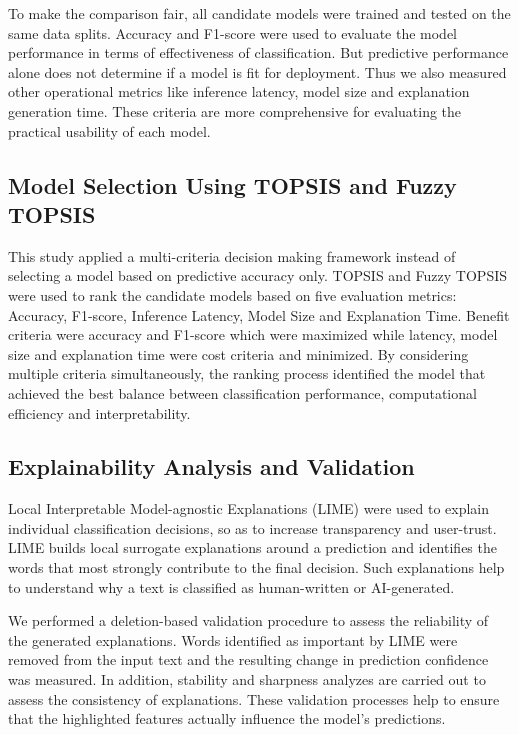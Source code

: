 \documentclass[conference]{IEEEtran}
\begin{document}
To make the comparison fair, all candidate models were trained and tested on the same data splits. Accuracy and F1-score were used to evaluate the model performance in terms of effectiveness of classification. But predictive performance alone does not determine if a model is fit for deployment. Thus we also measured other operational metrics like inference latency, model size and explanation generation time. These criteria are more comprehensive for evaluating the practical usability of each model.


\subsection{\textbf{Model Selection Using TOPSIS and Fuzzy TOPSIS}}


This study applied a multi-criteria decision making framework instead of selecting a model based on predictive accuracy only. TOPSIS and Fuzzy TOPSIS were used to rank the candidate models based on five evaluation metrics: Accuracy, F1-score, Inference Latency, Model Size and Explanation Time. Benefit criteria were accuracy and F1-score which were maximized while latency, model size and explanation time were cost criteria and minimized. By considering multiple criteria simultaneously, the ranking process identified the model that achieved the best balance between classification performance, computational efficiency and interpretability.

\subsection{\textbf{Explainability Analysis and Validation}}
Local Interpretable Model-agnostic Explanations (LIME) were used to explain individual classification decisions, so as to increase transparency and user-trust. LIME builds local surrogate explanations around a prediction and identifies the words that most strongly contribute to the final decision. Such explanations help to understand why a text is classified as human-written or AI-generated.

We performed a deletion-based validation procedure to assess the reliability of the generated explanations. Words identified as important by LIME were removed from the input text and the resulting change in prediction confidence was measured. In addition, stability and sharpness analyzes are carried out to assess the consistency of explanations. These validation processes help to ensure that the highlighted features actually influence the model’s predictions.
\end{document}
